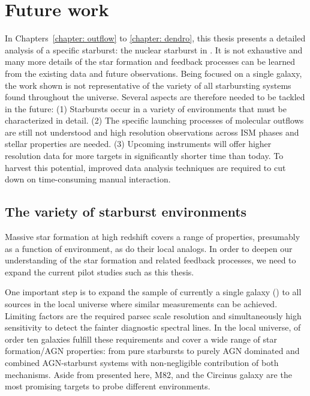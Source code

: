 
\chapter{Future work}
\label{chapter: future work}


In Chapters~\ref{chapter: outflow} to \ref{chapter: dendro}, this thesis presents a detailed analysis of a specific starburst: the nuclear starburst in . It is not exhaustive and many more details of the star formation and feedback processes can be learned from the existing data and future observations. Being focused on a single galaxy, the work shown is not representative of the variety of all starbursting systems found throughout the universe.
Several aspects are therefore needed to be tackled in the future:
(1) Starbursts occur in a variety of environments that must be characterized in detail.
(2) The specific launching processes of molecular outflows are still not understood and high resolution observations across ISM phases and stellar properties are needed.
(3) Upcoming instruments will offer higher resolution data for more targets in significantly shorter time than today. To harvest this potential, improved data analysis techniques are required to cut down on time-consuming manual interaction.



\section{The variety of starburst environments}
\label{discussion: section: starburst environments}

Massive star formation at high redshift covers a range of properties, presumably as a function of environment, as do their local analogs. In order to deepen our understanding of the star formation and related feedback processes, we need to expand the current pilot studies such as this thesis. 

One important step is to expand the sample of currently a single galaxy () to all sources in the local universe where similar measurements can be achieved. Limiting factors are the required parsec scale resolution and simultaneously high sensitivity to detect the fainter diagnostic spectral lines.
In the local universe, of order ten galaxies fulfill these requirements and cover a wide range of star formation/AGN properties: from pure starbursts to purely AGN dominated and combined AGN-starburst systems with non-negligible contribution of both mechanisms.
Aside from  presented here, M82,  and the Circinus galaxy are the most promising targets to probe different environments.


